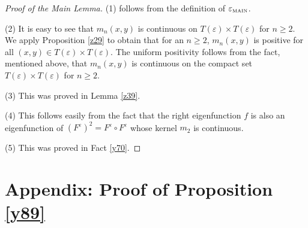 \documentclass[amssymb,amsfonts,12pt,verbatim,righttag,oneside]{amsart}
\numberwithin{equation}{section} %
\theoremstyle{plain}
\theoremstyle{plain}
\begin{document}
\begin{proof}[Proof of the Main Lemma]
(1) follows from the definition of $\varepsilon _{{\rm\scriptscriptstyle{MAIN}}}$.

(2) It is easy to see that $m_n(x,y)$ is continuous on $T(\varepsilon )\times T(\varepsilon )$ for $n\geq 2$. We apply Proposition \ref{z29}
to obtain that for an $n\geq2$,  $m_n(x,y)$ is positive for all $(x,y)\in T(\varepsilon )\times T(\varepsilon )$. The uniform positivity follows from the fact, mentioned above, that $m_{n}(x,y)$ is continuous on the compact set $T(\varepsilon )\times T(\varepsilon )$ for $n\geq 2$.

(3) This was proved in Lemma \ref{z39}.


(4) This follows easily from the fact  that the right eigenfunction $f$ is also an eigenfunction of  $(F^{\varepsilon })^2=F^{\varepsilon }\circ F^{\varepsilon }$ whose kernel $m_2$ is continuous.

(5) This was proved in Fact \ref{y70}.

\end{proof}



\section{Appendix: Proof of Proposition \ref{y89}}
\end{document}
